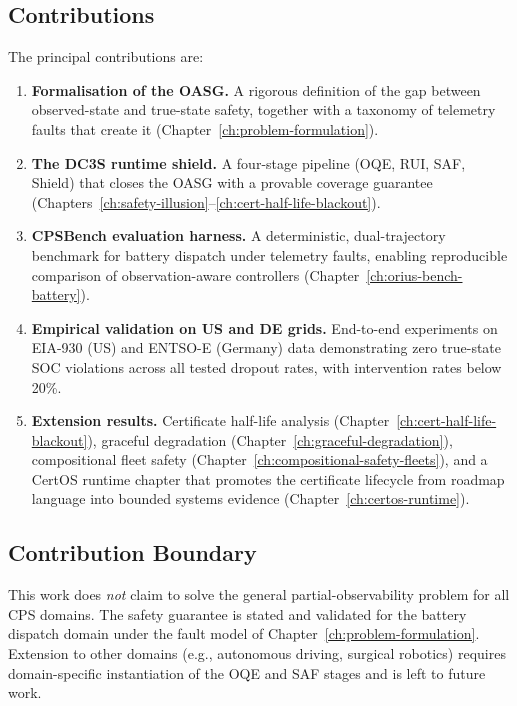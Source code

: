 \subsection{Contributions}

The principal contributions are:

\begin{enumerate}
  \item \textbf{Formalisation of the OASG.}  A rigorous definition of the
    gap between observed-state and true-state safety, together with a
    taxonomy of telemetry faults that create it
    (Chapter~\ref{ch:problem-formulation}).
  \item \textbf{The DC3S runtime shield.}  A four-stage pipeline (OQE,
    RUI, SAF, Shield) that closes the OASG with a provable coverage
    guarantee (Chapters~\ref{ch:safety-illusion}--\ref{ch:cert-half-life-blackout}).
  \item \textbf{CPSBench evaluation harness.}  A deterministic,
    dual-trajectory benchmark for battery dispatch under telemetry faults,
    enabling reproducible comparison of observation-aware controllers
    (Chapter~\ref{ch:orius-bench-battery}).
  \item \textbf{Empirical validation on US and DE grids.}  End-to-end
    experiments on EIA-930 (US) and ENTSO-E (Germany) data demonstrating
    zero true-state SOC violations across all tested dropout rates, with
    intervention rates below 20\%.
  \item \textbf{Extension results.}  Certificate half-life analysis
    (Chapter~\ref{ch:cert-half-life-blackout}), graceful degradation
    (Chapter~\ref{ch:graceful-degradation}), compositional fleet safety
    (Chapter~\ref{ch:compositional-safety-fleets}), and a CertOS runtime
    chapter that promotes the certificate lifecycle from roadmap language
    into bounded systems evidence (Chapter~\ref{ch:certos-runtime}).
\end{enumerate}

\subsection{Contribution Boundary}

This work does \emph{not} claim to solve the general partial-observability
problem for all CPS domains.  The safety guarantee is stated and validated
for the battery dispatch domain under the fault model of
Chapter~\ref{ch:problem-formulation}.  Extension to other domains
(e.g., autonomous driving, surgical robotics) requires domain-specific
instantiation of the OQE and SAF stages and is left to future work.

